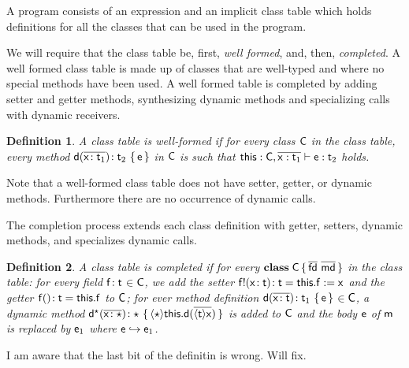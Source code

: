 \documentclass[preprint]{sigplanconf}
\newcommand{\fd}{\M{\xt{fd}}}
\newcommand{\md}{\M{\xt{md}}}
\newcommand{\m}{\M{\xt{m}}}
\newcommand{\e}{\M{\xt{e}}}
\renewcommand{\d}{\M{\xt{d}}}
\newcommand{\f}{\M{\xt{f}}}
\newcommand{\x}{\M{\xt{x}}}
\renewcommand{\t}{\M{\xt{t}}}
\newcommand{\C}{\M{\xt{C}}}
\newcommand{\this}{\M{\xt{this}}}
\renewcommand{\d}{\M{\xt{d}}}
\newcommand{\tp}[1]{\M{ \t_{#1} }}
\newcommand{\ep}[1]{\M{ \e_{#1} }}
\newcommand{\Get}[2]{\M{#1.#2}}
\newcommand{\Set}[3]{\M{#1.#2:=#3}}
\newcommand{\Call}[3]{\M{#1.#2(#3)}}
\newcommand{\Cast}[2]{\M{\langle{#1}\rangle{#2}}}
\newcommand{\any}{\M{\star}}
\newcommand{\HT}[2]{\M{{#1}\!:{#2}}}
\newcommand{\Mdef}[5]{\M{ \HT { #1( \b{\HT{#2}{#3}})}{#4}~ \{\, {#5} \,\} }}
\newcommand{\SMdef}[5]{\M{ \HT { #1!( \HT{#2}{#3})}{#4}= {#5}}}
\newcommand{\GMdef}[3]{\M{ \HT { #1()}{#2}={#3}}}
\newcommand{\Ftype}[2]{\M{ \HT{#1}{#2} }}
\newcommand{\Class}[3]{\M{\bt{class}\;#1\,\{\, #2 ~ #3\, \}}}
\newcommand{\M}[1]{\ensuremath{#1}\xspace}
\newcommand{\xt}[1]{{\sf{#1}}\xspace}
\newcommand{\bt}[1]{\xt{\bf #1}}
\renewcommand{\b}[1]{\M{\overline{#1}}}
\newcommand{\inc}{\M{\in}}
\newcommand{\EnvType}[3]{ \M{#1 \vdash #2 : #3}}
\newcommand{\TransClass}[2]{\M{ #1 \hookrightarrow #2 }}
\newcommand{\Dyn}[1]{\M{#1^{\any} }}
\newtheorem{definition}{Definition}
\begin{document}


A program consists of an expression and an implicit class table which holds
definitions for all the classes that can be used in the program.

We will require that the class table be, first, \emph{well formed}, and,
then, \emph{completed}.  A well formed class table is made up of classes
that are well-typed and where no special methods have been used.  A well
formed table is completed by adding setter and getter methods, synthesizing
dynamic methods and specializing calls with dynamic receivers.

\begin{definition} A class table is well-formed if for every class \C  in
the class table, every method \Mdef\d\x{\tp1}{\tp2}\e in \C is such that
\EnvType{\this:\C,\b{\x:\tp1}}\e{\tp2} holds.
\end{definition}

Note that a well-formed class table does not have setter, getter, or dynamic
methods. Furthermore there are no occurrence of dynamic calls.

The completion process extends each class definition with getter, setters,
dynamic methods, and specializes dynamic calls.

\begin{definition} A class table is completed if for every 
 \Class \C {\b{\fd}} {\b{\md}} in the class table: for every field
 \Ftype\f\t\inc\C, we add the setter \SMdef\f\x\t\t{\Set\this\f\x} and the
 getter \GMdef\f\t{\Get\this\f} to \C; for ever method definition
 \Mdef\d\x\t{\tp1}\e\inc\C, a dynamic method \Mdef{\Dyn\d}\x\any\any{
   \Cast\any{\Call\this\d{\b{\Cast\t\x }} }} is added to \C and the body \e of
 \m is replaced by  \ep1 where \TransClass\e{\ep1}.
\end{definition}

I am aware that the last bit of the definitin is wrong. Will fix.
\end{document}
